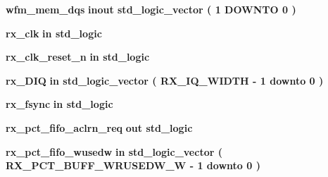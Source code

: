 \begin{DoxyCompactItemize}
\item 
{\bf wfm\+\_\+mem\+\_\+dqs}  {\bfseries {\bfseries \textcolor{keywordflow}{inout}\textcolor{vhdlchar}{ }}} {\bfseries \textcolor{comment}{std\+\_\+logic\+\_\+vector}\textcolor{vhdlchar}{ }\textcolor{vhdlchar}{(}\textcolor{vhdlchar}{ }\textcolor{vhdlchar}{ } \textcolor{vhdldigit}{1} \textcolor{vhdlchar}{ }\textcolor{keywordflow}{D\+O\+W\+N\+TO}\textcolor{vhdlchar}{ }\textcolor{vhdlchar}{ } \textcolor{vhdldigit}{0} \textcolor{vhdlchar}{ }\textcolor{vhdlchar}{)}\textcolor{vhdlchar}{ }} 
\item 
{\bf rx\+\_\+clk}  {\bfseries {\bfseries \textcolor{keywordflow}{in}\textcolor{vhdlchar}{ }}} {\bfseries \textcolor{comment}{std\+\_\+logic}\textcolor{vhdlchar}{ }} 
\item 
{\bf rx\+\_\+clk\+\_\+reset\+\_\+n}  {\bfseries {\bfseries \textcolor{keywordflow}{in}\textcolor{vhdlchar}{ }}} {\bfseries \textcolor{comment}{std\+\_\+logic}\textcolor{vhdlchar}{ }} 
\item 
{\bf rx\+\_\+\+D\+IQ}  {\bfseries {\bfseries \textcolor{keywordflow}{in}\textcolor{vhdlchar}{ }}} {\bfseries \textcolor{comment}{std\+\_\+logic\+\_\+vector}\textcolor{vhdlchar}{ }\textcolor{vhdlchar}{(}\textcolor{vhdlchar}{ }\textcolor{vhdlchar}{ }\textcolor{vhdlchar}{ }\textcolor{vhdlchar}{ }{\bfseries {\bf R\+X\+\_\+\+I\+Q\+\_\+\+W\+I\+D\+TH}} \textcolor{vhdlchar}{-\/}\textcolor{vhdlchar}{ } \textcolor{vhdldigit}{1} \textcolor{vhdlchar}{ }\textcolor{keywordflow}{downto}\textcolor{vhdlchar}{ }\textcolor{vhdlchar}{ } \textcolor{vhdldigit}{0} \textcolor{vhdlchar}{ }\textcolor{vhdlchar}{)}\textcolor{vhdlchar}{ }} 
\item 
{\bf rx\+\_\+fsync}  {\bfseries {\bfseries \textcolor{keywordflow}{in}\textcolor{vhdlchar}{ }}} {\bfseries \textcolor{comment}{std\+\_\+logic}\textcolor{vhdlchar}{ }} 
\item 
{\bf rx\+\_\+pct\+\_\+fifo\+\_\+aclrn\+\_\+req}  {\bfseries {\bfseries \textcolor{keywordflow}{out}\textcolor{vhdlchar}{ }}} {\bfseries \textcolor{comment}{std\+\_\+logic}\textcolor{vhdlchar}{ }} 
\item 
{\bf rx\+\_\+pct\+\_\+fifo\+\_\+wusedw}  {\bfseries {\bfseries \textcolor{keywordflow}{in}\textcolor{vhdlchar}{ }}} {\bfseries \textcolor{comment}{std\+\_\+logic\+\_\+vector}\textcolor{vhdlchar}{ }\textcolor{vhdlchar}{(}\textcolor{vhdlchar}{ }\textcolor{vhdlchar}{ }\textcolor{vhdlchar}{ }\textcolor{vhdlchar}{ }{\bfseries {\bf R\+X\+\_\+\+P\+C\+T\+\_\+\+B\+U\+F\+F\+\_\+\+W\+R\+U\+S\+E\+D\+W\+\_\+W}} \textcolor{vhdlchar}{-\/}\textcolor{vhdlchar}{ } \textcolor{vhdldigit}{1} \textcolor{vhdlchar}{ }\textcolor{keywordflow}{downto}\textcolor{vhdlchar}{ }\textcolor{vhdlchar}{ } \textcolor{vhdldigit}{0} \textcolor{vhdlchar}{ }\textcolor{vhdlchar}{)}\textcolor{vhdlchar}{ }} 

\end{DoxyCompactItemize}

